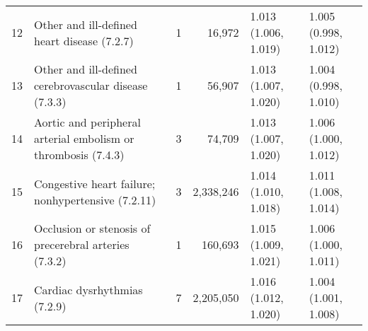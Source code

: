\begin{tabular}{lp{6.5cm}rrp{2.2cm}p{2.2cm}}
    12 & Other and ill-defined heart disease (7.2.7) &    1 & 16,972 & 1.013 (1.006, 1.019) & 1.005 (0.998, 1.012) \\ 
    13 & Other and ill-defined cerebrovascular disease (7.3.3) &    1 & 56,907 & 1.013 (1.007, 1.020) & 1.004 (0.998, 1.010) \\ 
    14 & Aortic and peripheral arterial embolism or thrombosis (7.4.3) &    3 & 74,709 & 1.013 (1.007, 1.020) & 1.006 (1.000, 1.012) \\ 
    15 & Congestive heart failure; nonhypertensive (7.2.11) &    3 & 2,338,246 & 1.014 (1.010, 1.018) & 1.011 (1.008, 1.014) \\ 
    16 & Occlusion or stenosis of precerebral arteries (7.3.2) &    1 & 160,693 & 1.015 (1.009, 1.021) & 1.006 (1.000, 1.011) \\ 
    17 & Cardiac dysrhythmias (7.2.9) &    7 & 2,205,050 & 1.016 (1.012, 1.020) & 1.004 (1.001, 1.008) \\ 
   \hline
\end{tabular}


